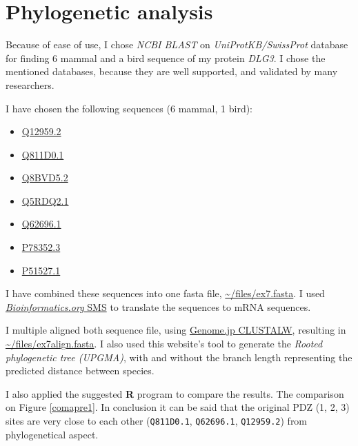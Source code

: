 \chapter{Phylogenetic analysis}

Because of ease of use, I chose \emph{NCBI BLAST} on \emph{UniProtKB/SwissProt} database for finding 6 mammal and a bird sequence of my protein \emph{DLG3}.
I chose the mentioned databases, because they are well supported, and validated by many researchers.

I have chosen the following sequences (6 mammal, 1 bird):
\begin{itemize}
\item \href{https://blast.ncbi.nlm.nih.gov/Blast.cgi#alnHdr_223590196}{Q12959.2}
\item \href{https://blast.ncbi.nlm.nih.gov/Blast.cgi#alnHdr_59797853}{Q811D0.1}

\item \href{https://blast.ncbi.nlm.nih.gov/Blast.cgi#alnHdr_182667930}{Q8BVD5.2}
\item \href{https://blast.ncbi.nlm.nih.gov/Blast.cgi#alnHdr_67460767}{Q5RDQ2.1}

\item \href{https://blast.ncbi.nlm.nih.gov/Blast.cgi#alnHdr_2497505}{ 	Q62696.1}
\item \href{https://blast.ncbi.nlm.nih.gov/Blast.cgi#alnHdr_71658825}{P78352.3}

\item \href{https://www.ncbi.nlm.nih.gov/protein/1708495?report=genbank&log\$=prottop&blast_rank=2&RID=33MZJTCK014}{P51527.1}
\end{itemize}

I have combined these sequences into one fasta file, \url{~/files/ex7.fasta}.
I used \href{http://www.bioinformatics.org/sms2/rev_trans.html}{\emph{Bioinformatics.org} SMS} to translate the sequences to mRNA sequences.

I multiple aligned both sequence file, using \href{http://www.genome.jp/tools-bin/clustalw}{Genome.jp CLUSTALW}, resulting in \url{~/files/ex7align.fasta}.
I also used this website's tool to generate the \emph{Rooted phylogenetic tree (UPGMA)}, with and without the branch length representing the predicted distance between species.

I also applied the suggested \textbf{R} program to compare the results.
The comparison on Figure \ref{comapre1}.
In conclusion it can be said that the original PDZ (1, 2, 3) sites are very close to each other (\texttt{Q811D0.1}, \texttt{Q62696.1}, \texttt{Q12959.2}) from phylogenetical aspect.



